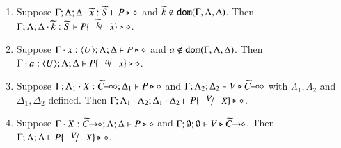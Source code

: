 \begin{lemma}\rm
	\label{l:subst}
	\begin{enumerate}[1.]
		\item	Suppose $\Gamma; \Lambda; \Delta \cdot \widetilde{x}:\widetilde{S}  \vdash P \triangleright \diamond$ and
			$\widetilde{k} \not\in \mathtt{dom}(\Gamma, \Lambda, \Delta)$. 
			Then $\Gamma; \Lambda; \Delta \cat \mytilde{k}:\mytilde{S}  \vdash P\subst{\mytilde{k}}{\mytilde{x}} \hastype \Proc$.

		\item	Suppose $\Gamma \cdot x:\langle U \rangle; \Lambda; \Delta \vdash P \triangleright \diamond$ and
			$a \notin \mathtt{dom}(\Gamma, \Lambda, \Delta)$. 
			Then $\Gamma \cat a:\chtype{U}; \Lambda; \Delta   \vdash P\subst{a}{x} \hastype \Proc$.

		\item	Suppose $\Gamma; \Lambda_1 \cdot X:\widetilde{C}\!\! \multimap\!\! \diamond; \Delta_1  \vdash P \triangleright \diamond$ 
			and $\Gamma; \Lambda_2; \Delta_2  \vdash V \triangleright \widetilde{C}\!\! \multimap\!\! \diamond$ with 
			$\Lambda_1, \Lambda_2$ and $\Delta_1, \Delta_2$ defined.  
			Then $\Gamma; \Lambda_1 \cat \Lambda_2; \Delta_1 \cat \Delta_2  \proves P\subst{V}{X} \hastype \Proc$.

		\item	Suppose $\Gamma \cdot X:\widetilde{C}\!\! \rightarrow\!\! \diamond; \Lambda; \Delta  \vdash P \triangleright \diamond$ and
			$\Gamma; \emptyset ; \emptyset  \vdash V \triangleright \widetilde{C}\!\! \rightarrow\!\! \diamond$.
			Then $\Gamma; \Lambda; \Delta  \proves P\subst{V}{X} \hastype \Proc$.
		\end{enumerate}
\end{lemma}

